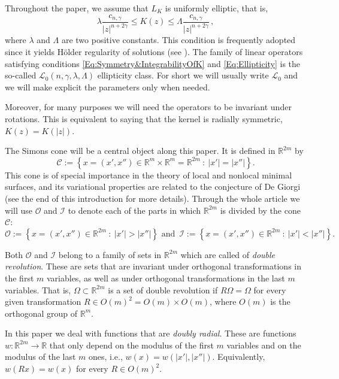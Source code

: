 \documentclass[12pt,reqno]{amsart}
\theoremstyle{definition}
\theoremstyle{remark}
\newcommand{\con}[1]{\mathbb{#1}}
\newcommand{\R}{\con{R}} %
\newcommand{\ccal}{\mathscr{C}}
\newcommand{\ical}{\mathcal{I}}
\newcommand{\lcal}{\mathcal{L}}
\newcommand{\ocal}{\mathcal{O}}
\newcommand{\s}{\gamma}
\newcommand{\setcond}[2]{\left \{ #1 \ : \ #2  \right \}}
\numberwithin{equation}{section}
\begin{document}
	Throughout the paper, we assume that $L_K$ is uniformly elliptic, that is,
	\begin{equation}
	\label{Eq:Ellipticity}
	\lambda \dfrac{c_{n,\s}}{|z|^{n+2\s}} \leq K(z) \leq \Lambda \dfrac{c_{n,\s}}{|z|^{n+2\s}}\,, 
	\end{equation}
	where $\lambda$ and $\Lambda$ are two positive constants. This condition is frequently adopted since it yields Hölder regularity of solutions (see \cite{RosOton-Survey,SerraC2s+alphaRegularity}). The family of linear operators satisfying conditions \eqref{Eq:Symmetry&IntegrabilityOfK} and \eqref{Eq:Ellipticity} is the so-called $\lcal_0(n,\s,\lambda, \Lambda)$ ellipticity class. For short we will usually write $\lcal_0$ and we will make explicit the parameters only when needed. 
	
	Moreover, for many  purposes we will need the operators to be invariant under rotations. This is equivalent to saying that the kernel is radially symmetric, $K(z) = K(|z|)$. 
	
	
	
	
	The Simons cone will be a central object along this paper. It is defined in $\R^{2m}$ by
	\begin{equation}
	\label{Eq:SimonsCone}
	\mathscr{C} := \setcond{x = (x', x'') \in \R^m \times \R^m=\R^{2m}}{|x'| = |x''|}.
	\end{equation}
	This cone is of special importance in the theory of local and nonlocal minimal surfaces, and its variational properties are related to the conjecture of De Giorgi (see the end of this introduction for more details). Through the whole article we will use $\ocal$ and $\ical$ to denote each of the parts in which $\R^{2m}$ is divided by the cone $\ccal$:
	$$
	\ocal:= \setcond{x = (x', x'') \in \R^{2m}}{|x'| > |x''|} \textrm{ and } \,
	\ical:= \setcond{x = (x', x'') \in \R^{2m}}{|x'| < |x''|}\!.
	$$
	
	Both $\ocal$ and $\ical$ belong to a family of sets in $\R^{2m}$ which are called of \emph{double revolution}. These are sets that are invariant under orthogonal transformations in the first $m$ variables, as well as under orthogonal transformations in the last $m$ variables. That is, $\Omega\subset \R^{2m}$ is a set of double revolution if $R\Omega = \Omega$ for every given transformation $R\in O(m)^2 = O(m) \times O(m)$, where  $O(m)$ is the orthogonal group of $\R^m$.
	
	In this paper we deal with functions that are \emph{doubly radial}. These are functions $w:\R^{2m}  \to \R$ that only depend on the modulus of the first $m$ variables and on the modulus of the last $m$ ones, i.e., $w(x) = w(|x'|,|x''|)$. Equivalently, $w(Rx) = w(x)$ for every $R \in O(m)^2$.
	
\end{document}
